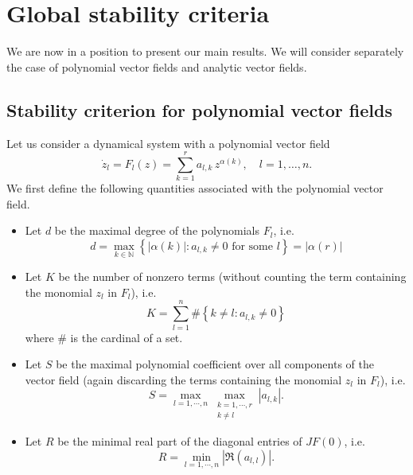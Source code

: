 \documentclass{article}
\begin{document}
\section{Global stability criteria}
\label{sec:mainresult}


We are now in a position to present our main results. We will consider separately the case of polynomial vector fields and analytic vector fields.

\subsection{Stability criterion for polynomial vector fields}

Let us consider a dynamical system with a polynomial vector field
\begin{equation}\label{eq:syst_rescalling}
\dot{z}_l=F_l(z)=\sum_{k=1}^r a_{l,k} \, z^{\alpha(k)}, \quad l=1,\dots,n.
\end{equation}
We first define the following quantities associated with the polynomial vector field.
\begin{itemize}
\item Let $d$ be the maximal degree of the polynomials $F_l$, i.e.
\begin{equation*}
d=\max_{k \in \mathbb{N}} \left \{ |\alpha(k)| : a_{l,k} \neq 0 \textrm{ for some } l\right\} = |\alpha(r)|
\end{equation*}
\item Let $K$ be the number of nonzero terms (without counting the term containing the monomial $z_l$ in $F_l$), i.e.
\begin{equation}
\label{eq:nb_terms}
K=\sum_{l=1}^n \# \left \{ k \neq l:a_{l,k} \neq 0 \right\}
\end{equation}
where $\#$ is the cardinal of a set.
\item Let $S$ be the maximal polynomial coefficient over all components of the vector field (again discarding the terms containing the monomial $z_l$ in $F_l$), i.e.
\begin{equation*}\label{eq:cond_thrm1}
S=\max_{l=1,\cdots,n} \max_{\substack{ k=1,\cdots,r\\ k\neq l}}   \left|a_{l,k}\right|.
\end{equation*}
\item Let $R$ be the minimal real part of the diagonal entries of $JF(0)$, i.e.
\begin{equation*}\label{eq:cond_thrm12}
R=\min_{l=1,\cdots,n}   \left|\Re\left(a_{l,l}\right)\right|.
\end{equation*}
\end{itemize}
\end{document}
